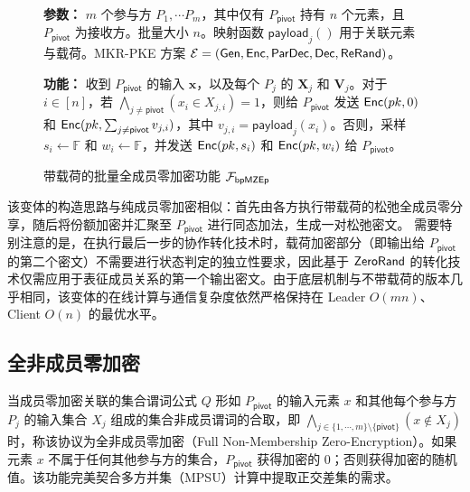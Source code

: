 \begin{figure}[!htb]
\begin{framed}
\begin{minipage}[c]{\textwidth}
\begin{trivlist}
\item \textbf{参数：} $m$ 个参与方 $P_1, \cdots P_m$，其中仅有 $P_\mathsf{pivot}$ 持有 $n$ 个元素，且 $P_\mathsf{pivot}$ 为接收方。批量大小 $n$。映射函数 $\mathsf{payload}_j()$ 用于关联元素与载荷。MKR-PKE 方案 $\mathcal{E} = (\mathsf{Gen}, \mathsf{Enc}, \mathsf{ParDec}, \mathsf{Dec}, \mathsf{ReRand})$。
\item \textbf{功能：} 收到 $P_\mathsf{pivot}$ 的输入 $\textbf{x}$，以及每个 $P_j$ 的 $\textbf{X}_j$ 和 $\textbf{V}_j$。对于 $i \in [n]$，若 $\bigwedge_{j \neq \mathsf{pivot}} (x_i \in X_{j,i}) = 1$，则给 $P_\mathsf{pivot}$ 发送 $\mathsf{Enc}(pk,0)$ 和 $\mathsf{Enc}(pk, \sum_{j \neq \mathsf{pivot}} v_{j,i})$，其中 $v_{j,i} = \mathsf{payload}_j(x_i)$。否则，采样 $s_i \gets \mathbb{F}$ 和 $w_i \gets \mathbb{F}$，并发送 $\mathsf{Enc}(pk,s_i)$ 和 $\mathsf{Enc}(pk,w_i)$ 给 $P_\mathsf{pivot}$。
\end{trivlist}
\end{minipage}
\end{framed}
\caption{带载荷的批量全成员零加密功能 $\mathcal{F}_\mathsf{bpMZEp}$}\label{fig:func-mzep}
\end{figure}

该变体的构造思路与纯成员零加密相似：首先由各方执行带载荷的松弛全成员零分享，随后将份额加密并汇聚至 $P_\mathsf{pivot}$ 进行同态加法，生成一对松弛密文。
需要特别注意的是，在执行最后一步的协作转化技术时，载荷加密部分（即输出给 $P_\mathsf{pivot}$ 的第二个密文）不需要进行状态判定的独立性要求，因此基于 $\mathsf{ZeroRand}$ 的转化技术仅需应用于表征成员关系的第一个输出密文。由于底层机制与不带载荷的版本几乎相同，该变体的在线计算与通信复杂度依然严格保持在 Leader $O(mn)$、Client $O(n)$ 的最优水平。

\subsection{全非成员零加密} 

当成员零加密关联的集合谓词公式 $Q$ 形如 $P_\mathsf{pivot}$ 的输入元素 $x$ 和其他每个参与方 $P_j$ 的输入集合 $X_j$ 组成的集合非成员谓词的合取，即 $\bigwedge_{j \in \{1,\cdots,m\} \setminus \{\mathsf{pivot}\}} (x \notin X_j)$ 时，称该协议为全非成员零加密（Full Non-Membership Zero-Encryption）。如果元素 $x$ 不属于任何其他参与方的集合，$P_\mathsf{pivot}$ 获得加密的 0；否则获得加密的随机值。该功能完美契合多方并集（MPSU）计算中提取正交差集的需求。

